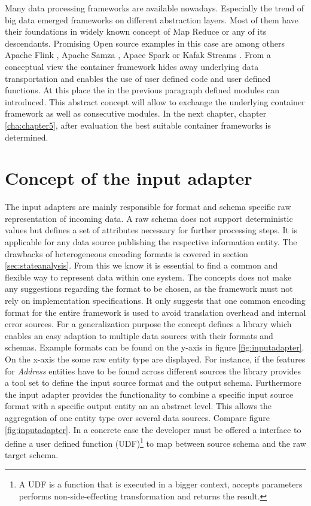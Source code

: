 Many data processing frameworks are available nowadays. Especially the trend of big data emerged frameworks on different abstraction layers. Most of them have their foundations in widely known concept of Map Reduce \cite{dean_ghemawat_2008} or any of its descendants. Promising Open source examples in this case are among others Apache Flink \cite{flink_2017}, Apache Samza \cite{samza_2017}, Apace Spark \cite{spark_2017} or Kafak Streams \cite{kafka_2017}. From a conceptual view the container framework hides away underlying data transportation and enables the use of user defined code and user defined functions. At this place the in the previous paragraph defined modules can introduced. This abstract concept will allow to exchange the underlying container framework as well as consecutive modules. In the next chapter, chapter \ref{cha:chapter5}, after evaluation the best suitable container frameworks is determined.

\section{Concept of the input adapter \label{sec:inputadapter}}

The input adapters are mainly responsible for format and schema specific raw representation of incoming data. A raw schema does not support deterministic values but defines a set of attributes necessary for further processing steps. It is applicable for any data source publishing the respective information entity. The drawbacks of heterogeneous encoding formats is covered in section \ref{sec:stateanalysis}. From this we know it is essential to find a common and flexible way to represent data within one system. The concepts does not make any suggestions regarding the format to be chosen, as the framework must not rely on implementation specifications. It only suggests that one common encoding format for the entire framework is used to avoid translation overhead and internal error sources. For a generalization purpose the concept defines a library which enables an easy adaption to multiple data sources with their formats and schemas. Example formats can be found on the y-axis in figure \ref{fig:inputadapter}. On the x-axis the some raw entity type are displayed. For instance, if the features for \textit{Address} entities have to be found across different sources the library provides a tool set to define the input source format and the output schema. Furthermore the input adapter provides the functionality to combine a specific input source format with a specific output entity an an abstract level. This allows the aggregation of one entity type over several data sources. Compare figure \ref{fig:inputadapter}. In a concrete case the developer must be offered a interface to define a user defined function (UDF)\footnote{A UDF is a function that is executed in a bigger context, accepts parameters performs non-side-effecting transformation and returns the result.} to map between source schema and the raw target schema. 

